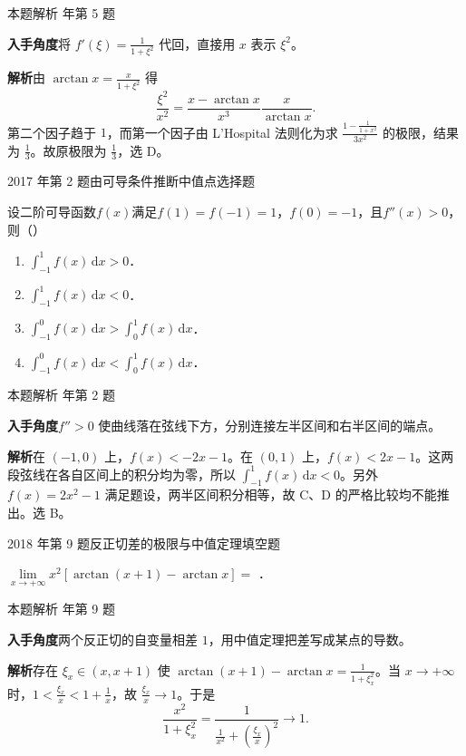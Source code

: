 \documentclass[UTF8,zihao=-4,fontset=fandol]{ctexart}
\renewcommand{\lim}{\operatorname*{lim}\limits}
\newcommand{\blank}{\underline{\hspace{5em}}}
\newcommand{\pickout}{\hfill（\hspace{1.4em}）}
\newenvironment{abcd}{\begin{enumerate}[label=\textup{(\Alph*)},leftmargin=2.3em,itemsep=1pt,topsep=4pt,parsep=1pt]}{\end{enumerate}}
\newcommand{\QuestionPage}[6]{%
  \par\noindent\begin{minipage}{\linewidth}
  \raggedright
  {\small\textcolor{black!60}{#3\quad #5}\hfill\textcolor{accent}{#2}}\par\smallskip}
\newcommand{\QuestionEnd}{\end{minipage}\par\medskip}
\newcommand{\QuestionPage}[6]{%
  \clearpage
  {\small\textcolor{accent}{#1\hfill #2}}\par\medskip
  {\small\textcolor{black!60}{#3\quad #5\hfill #6}}\par\vspace{9bp}}
\newcommand{\QuestionEnd}{}
\newenvironment{QuestionSolution}[1]{%
  \clearpage
  {\small\textcolor{black!60}{本题解析\quad #1}}\par\medskip
}{\par\clearpage}
\begin{document}
\begin{QuestionSolution}{2014 年第 5 题}
\textbf{入手角度}\quad 将 \(f'(\xi)=\frac{1}{1+\xi^2}\) 代回，直接用 \(x\) 表示 \(\xi^2\)。

\textbf{解析}\quad 由 \(\arctan x=\frac{x}{1+\xi^2}\) 得
\[
\frac{\xi^2}{x^2}
=\frac{x-\arctan x}{x^3}\frac{x}{\arctan x}.
\]
第二个因子趋于 \(1\)，而第一个因子由 L'Hospital 法则化为求 \(\frac{1-\frac{1}{1+x^2}}{3x^2}\) 的极限，结果为 \(\frac{1}{3}\)。故原极限为 \(\boxed{\frac{1}{3}}\)，选 D。
\end{QuestionSolution}

\QuestionPage{2.4 微分中值定理及其应用}{选择题}{2017 年第 2 题}{1}{由可导条件推断中值点}{085 / 234}
设二阶可导函数$f(x)$满足$f(1) = f(- 1) = 1$，$f(0) = - 1$，且$f''(x) > 0$，则\pickout{}
\begin{abcd}
\item $\int_{-1}^1 f(x)\,\mathrm{d} x > 0$．
\item $\int_{-1}^1 f(x)\,\mathrm{d} x < 0$．
\item $\int_{-1}^0 f(x)\,\mathrm{d} x > \int_0^1 f(x)\,\mathrm{d} x$．
\item $\int_{-1}^0 f(x)\,\mathrm{d} x < \int_0^1 f(x)\,\mathrm{d} x$．
\end{abcd}
\QuestionEnd

\begin{QuestionSolution}{2017 年第 2 题}
\textbf{入手角度}\quad \(f''>0\) 使曲线落在弦线下方，分别连接左半区间和右半区间的端点。

\textbf{解析}\quad 在 \((-1,0)\) 上，\(f(x)<-2x-1\)。在 \((0,1)\) 上，\(f(x)<2x-1\)。这两段弦线在各自区间上的积分均为零，所以 \(\int_{-1}^1 f(x)\,\mathrm{d}x<0\)。另外 \(f(x)=2x^2-1\) 满足题设，两半区间积分相等，故 C、D 的严格比较均不能推出。选 B。
\end{QuestionSolution}

\QuestionPage{2.4 微分中值定理及其应用}{填空题}{2018 年第 9 题}{2}{反正切差的极限与中值定理}{086 / 234}
$\lim_{x \to +\infty} x^2[\arctan(x + 1) - \arctan x] =$ \blank{}．
\QuestionEnd

\begin{QuestionSolution}{2018 年第 9 题}
\textbf{入手角度}\quad 两个反正切的自变量相差 \(1\)，用中值定理把差写成某点的导数。

\textbf{解析}\quad 存在 \(\xi_x\in(x,x+1)\) 使 \(\arctan(x+1)-\arctan x=\frac{1}{1+\xi_x^2}\)。当 \(x\to+\infty\) 时，\(1<\frac{\xi_x}{x}<1+\frac{1}{x}\)，故 \(\frac{\xi_x}{x}\to1\)。于是
\[
\frac{x^2}{1+\xi_x^2}=\frac{1}{\frac{1}{x^2}+(\frac{\xi_x}{x})^2}\longrightarrow\boxed{1}.
\]
\end{QuestionSolution}
\end{document}
